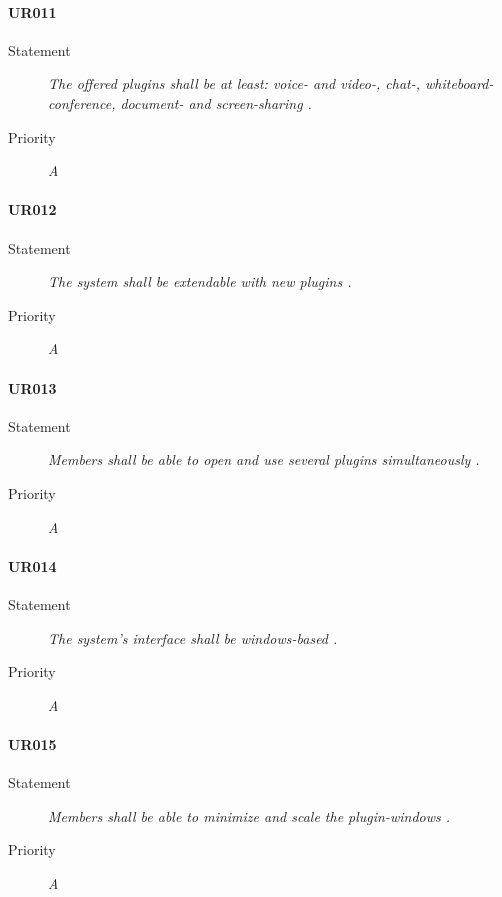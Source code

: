 \paragraph{UR011}
  \begin{description}
  \item [Statement] 
    \textit{ The offered plugins shall be at least: voice- and video-, 
            chat-, whiteboard-conference, document- and screen-sharing
    .}
  \item [Priority] \textit{A}
\end{description}
    
\paragraph{UR012}
  \begin{description}
  \item [Statement] 
    \textit{ The system shall be extendable with new plugins
    .}
  \item [Priority] \textit{A}
\end{description}
    
\paragraph{UR013}
  \begin{description}
  \item [Statement] 
    \textit{ Members shall be able to open and use several plugins simultaneously
    .}
  \item [Priority] \textit{A}
\end{description}
    
\paragraph{UR014}
  \begin{description}
  \item [Statement] 
    \textit{ The system's interface shall be windows-based
    .}
  \item [Priority] \textit{A}
\end{description}
    
\paragraph{UR015}
  \begin{description}
  \item [Statement] 
    \textit{ Members shall be able to minimize and scale the plugin-windows
    .}
  \item [Priority] \textit{A}
\end{description}
    
